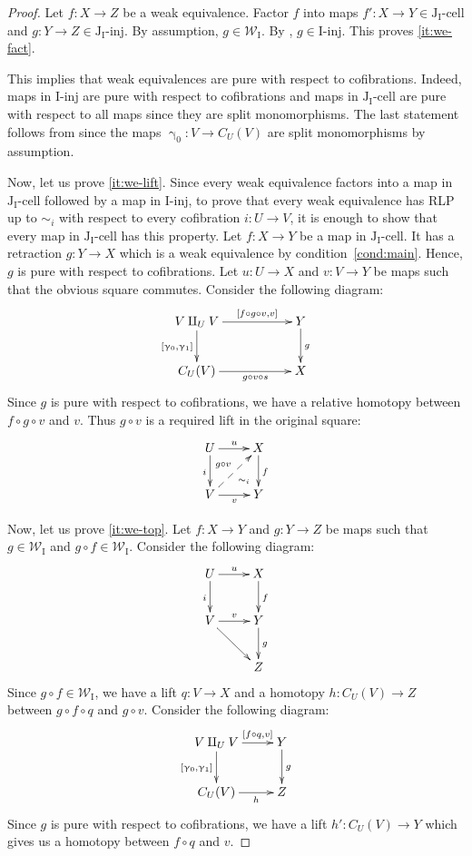 \documentclass{tac}
\theoremstyle{definition}
\newcommand{\we}{\mathcal{W}}
\newcommand{\I}{\mathrm{I}}
\newcommand{\J}{\mathrm{J}}
\newcommand{\class}[2]{#1\text{-}\mathrm{#2}}
\newcommand{\Iinj}[1][\I]{\class{#1}{inj}}
\newcommand{\Icell}[1][\I]{\class{#1}{cell}}
\newcommand{\Jinj}[1][]{\Iinj[\J#1]}
\newcommand{\Jcell}[1][]{\Icell[\J#1]}
\newcommand{\cyli}{\upgamma}
\begin{document}
\begin{proof}
Let $f : X \to Z$ be a weak equivalence.
Factor $f$ into maps $f' : X \to Y \in \Jcell[_\I]$ and $g : Y \to Z \in \Jinj[_\I]$.
By assumption, $g \in \we_\I$.
By , $g \in \Iinj$.
This proves \eqref{it:we-fact}.

This implies that weak equivalences are pure with respect to cofibrations.
Indeed, maps in $\Iinj$ are pure with respect to cofibrations and maps in $\Jcell[_\I]$ are pure with respect to all maps since they are split monomorphisms.
The last statement follows from  since the maps $\cyli_0 : V \to C_U(V)$ are split monomorphisms by assumption.

Now, let us prove \eqref{it:we-lift}.
Since every weak equivalence factors into a map in $\Jcell[_\I]$ followed by a map in $\Iinj$,
to prove that every weak equivalence has RLP up to $\sim_i$ with respect to every cofibration $i : U \to V$,
it is enough to show that every map in $\Jcell[_\I]$ has this property.
Let $f : X \to Y$ be a map in $\Jcell[_\I]$.
It has a retraction $g : Y \to X$ which is a weak equivalence by condition~\eqref{cond:main}.
Hence, $g$ is pure with respect to cofibrations.
Let $u : U \to X$ and $v : V \to Y$ be maps such that the obvious square commutes.
Consider the following diagram:
\[ \xymatrix{ V \amalg_U V \ar[rr]^-{[f \circ g \circ v, v]} \ar[d]_{[\cyli_0,\cyli_1]} & & Y \ar[d]^g \\
              C_U(V) \ar[rr]_-{g \circ v \circ s} & & X
            } \]
Since $g$ is pure with respect to cofibrations, we have a relative homotopy between $f \circ g \circ v$ and $v$.
Thus $g \circ v$ is a required lift in the original square:
\[ \xymatrix{ U \ar[r]^u \ar[d]_i \ar@{}[dr]|(.7){\sim_i}   & X \ar[d]^f \\
              V \ar[r]_v \ar@{-->}[ur]^{g \circ v}          & Y
            } \]

Now, let us prove \eqref{it:we-top}.
Let $f : X \to Y$ and $g : Y \to Z$ be maps such that $g \in \we_\I$ and $g \circ f \in \we_\I$.
Consider the following diagram:
\[ \xymatrix{ U \ar[r]^u \ar[d]_i & X \ar[d]^f \\
              V \ar[r]^v \ar[rd]  & Y \ar[d]^g \\
                                  & Z
            } \]
Since $g \circ f \in \we_\I$, we have a lift $q : V \to X$ and a homotopy $h : C_U(V) \to Z$ between $g \circ f \circ q$ and $g \circ v$.
Consider the following diagram:
\[ \xymatrix{ V \amalg_U V \ar[r]^-{[f \circ q, v]} \ar[d]_{[\cyli_0,\cyli_1]} & Y \ar[d]^g \\
              C_U(V) \ar[r]_-h & Z
            } \]
Since $g$ is pure with respect to cofibrations, we have a lift $h' : C_U(V) \to Y$ which gives us a homotopy between $f \circ q$ and $v$.


\end{proof}
\end{document}
